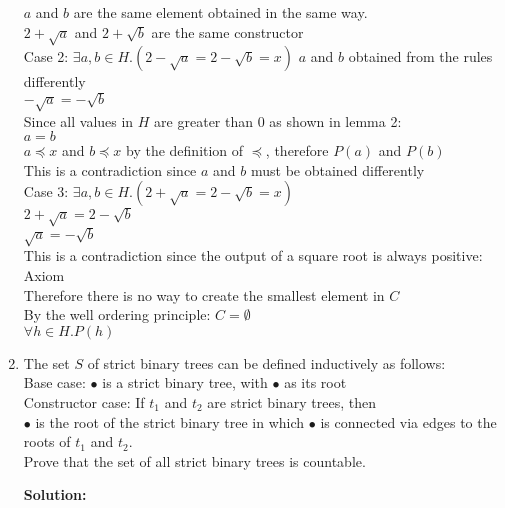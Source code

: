 \documentclass[11pt]{article}
\begin{document}
\begin{enumerate}
\begin{solution}
\null\qquad $a$ and $b$ are the same element obtained in the same way.\\
\null\qquad $ 2+\sqrt a$ and $2+\sqrt b$ are the same constructor\\
\null\qquad Case 2: $\exists a,b\in H.(2-\sqrt a = 2-\sqrt b = x)$ $a$ and $b$ obtained from the rules differently\\
\null\qquad $-\sqrt a = -\sqrt b$\\
\null\qquad Since all values in $H$ are greater than $0$ as shown in lemma 2:\\
\null\qquad $a = b$\\
\null\qquad $a\preccurlyeq x$ and $b\preccurlyeq x$ by the definition of $\preccurlyeq$, therefore $P(a)$ and $P(b)$\\
\null\qquad This is a contradiction since $a$ and $b$ must be obtained differently\\
\null\qquad Case 3: $\exists a,b\in H.(2+\sqrt a = 2-\sqrt b = x)$\\
\null\qquad $2+\sqrt a = 2-\sqrt b$ \\
\null\qquad $\sqrt a = -\sqrt b$\\
\null\qquad This is a contradiction since the output of a square root is always positive: Axiom\\
\null\quad Therefore there is no way to create the smallest element in $C$\\
By the well ordering principle: $C=\emptyset$\\
$\forall h\in H.P(h)$


\end{solution}

\item
\begin{question}
The set $S$ of strict binary trees can be defined inductively as follows:\\
Base case: $\bullet$ is a strict binary tree, with $\bullet$ as its root\\
Constructor case: If $t_1$ and $t_2$ are strict binary trees, then\\
$\bullet$ is the root of the strict binary tree in which $\bullet$ is connected via edges to the roots of $t_1$ and $t_2$.\\

Prove that the set of all strict binary trees is countable.
\end{question}

\begin{solution}
{\bf Solution:}\\

\end{solution}
\end{enumerate}
\end{document}
